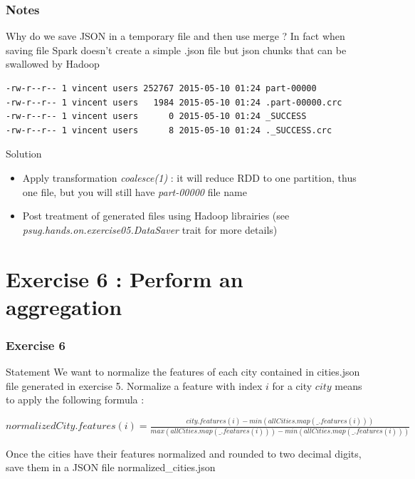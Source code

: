 \documentclass[slidetop,9pt,utf8]{beamer}
\begin{document}
\begin{CJK}{UTF8}{gbsn}
\begin{frame}[fragile]
\end{frame}

\begin{frame}[fragile]
  \frametitle{Notes}

  \begin{exampleblock}{Why do we save JSON in a temporary file and then use merge ?}
    In fact when saving file Spark doesn't create a simple .json file but json chunks that can be swallowed by Hadoop
  \end{exampleblock}

  \begin{lstlisting}[label=contentOfTemporaryFile, caption=Content of Temporary File, language=bash, style=terminal]
-rw-r--r-- 1 vincent users 252767 2015-05-10 01:24 part-00000
-rw-r--r-- 1 vincent users   1984 2015-05-10 01:24 .part-00000.crc
-rw-r--r-- 1 vincent users      0 2015-05-10 01:24 _SUCCESS
-rw-r--r-- 1 vincent users      8 2015-05-10 01:24 ._SUCCESS.crc
  \end{lstlisting}

  \begin{exampleblock}{Solution}
    \begin{itemize}
      \item Apply transformation \textit{coalesce(1)} : it will reduce RDD to one partition, thus one file, but you will still have \textit{part-00000} file name
      \item Post treatment of generated files using Hadoop librairies (see \textit{psug.hands.on.exercise05.DataSaver} trait for more details)
    \end{itemize}
  \end{exampleblock}

\end{frame}


\section{Exercise 6 : Perform an aggregation}

\begin{frame}
  \frametitle{Exercise 6}

  \begin{block}{Statement}
    We want to normalize the features of each city contained in cities.json file generated in exercise 5. Normalize a feature with index $i$ for a city $city$ means to apply the following formula :
\begin{center} 
    $normalizedCity.features(i) = \frac{city.features(i) - min(allCities.map(\_.features(i)))}{max(allCities.map(\_.features(i))) - min(allCities.map(\_.features(i)))}$
\end{center}
Once the cities have their features normalized and rounded to two decimal digits, save them in a JSON file normalized\_cities.json
  \end{block}


\end{frame}
\end{CJK}
\end{document}
